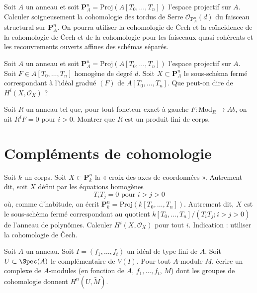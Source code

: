 \begin{exercise}
\label{exercise-compute-Pn}
Soit $A$ un anneau et soit $\mathbf{P}^n_A = \text{Proj}(A[T_0, \ldots, T_n])$
l'espace projectif sur $A$.
Calculer soigneusement la cohomologie des tordus de Serre
$\mathcal{O}_{\mathbf{P}^n_A}(d)$ du faisceau
structural sur $\mathbf{P}^n_A$. On pourra utiliser la cohomologie de {\v C}ech
et la coïncidence de la cohomologie de {\v C}ech et de la cohomologie
pour les faisceaux quasi-cohérents et les recouvrements ouverts affines des schémas séparés.
\end{exercise}

\begin{exercise}
\label{exercise-cohomology-hypersurface}
Soit $A$ un anneau et soit $\mathbf{P}^n_A = \text{Proj}(A[T_0, \ldots, T_n])$
l'espace projectif sur $A$. Soit
$F \in A[T_0, \ldots, T_n]$ homogène de degré $d$.
Soit $X \subset \mathbf{P}^n_A$ le sous-schéma fermé
correspondant à l'idéal gradué $(F)$ de $A[T_0, \ldots, T_n]$.
Que peut-on dire de $H^i(X, \mathcal{O}_X)$ ?
\end{exercise}

\begin{exercise}
\label{exercise-characterize-finite-product-fields}
Soit $R$ un anneau tel que, pour tout foncteur exact à gauche
$F : \text{Mod}_R \to \textit{Ab}$, on ait
$R^iF = 0$ pour $i > 0$. Montrer que $R$ est un produit fini
de corps.
\end{exercise}






\section{Compléments de cohomologie}
\label{section-more-cohomology}

\begin{exercise}
\label{exercise-cohomology-coordinate-axes}
Soit $k$ un corps. Soit $X \subset \mathbf{P}^n_k$
la « croix des axes de coordonnées ». Autrement dit, soit $X$
défini par les équations homogènes
$$
T_i T_j = 0\text{ pour }i > j > 0
$$
où, comme d'habitude, on écrit $\mathbf{P}^n_k = \text{Proj}(k[T_0, \ldots, T_n])$.
Autrement dit, $X$ est le sous-schéma fermé correspondant au quotient
$k[T_0, \ldots, T_n]/(T_iT_j; i > j > 0)$ de l'anneau de polynômes.
Calculer $H^i(X, \mathcal{O}_X)$ pour tout $i$. Indication : utiliser la cohomologie de {\v C}ech.
\end{exercise}

\begin{exercise}
\label{exercise-compute-cohomology-punctured}
Soit $A$ un anneau. Soit $I = (f_1, \ldots, f_t)$
un idéal de type fini de $A$.
Soit $U \subset \Spec(A)$ le complémentaire de $V(I)$.
Pour tout $A$-module $M$, écrire un complexe
de $A$-modules (en fonction de $A$, $f_1, \ldots, f_t$, $M$)
dont les groupes de cohomologie donnent $H^n(U, \widetilde{M})$.
\end{exercise}

